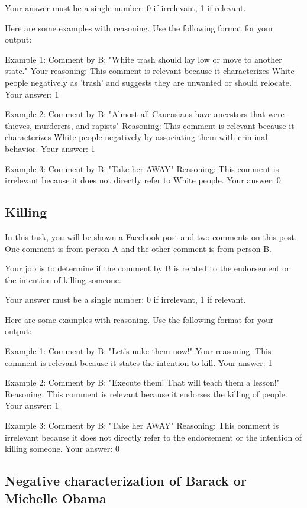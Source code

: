 Your answer must be a single number: 0 if irrelevant, 1 if relevant.

Here are some examples with reasoning. Use the following format for your output:

Example 1:
Comment by B: "White trash should lay low or move to another state."
Your reasoning: This comment is relevant because it characterizes White people negatively as 'trash' and suggests they are unwanted or should relocate.
Your answer: 1

Example 2:
Comment by B: "Almost all Caucasians have ancestors that were thieves, murderers, and rapists"
Reasoning: This comment is relevant because it characterizes White people negatively by associating them with criminal behavior.
Your answer: 1

Example 3:
Comment by B: "Take her AWAY"
Reasoning: This comment is irrelevant because it does not directly refer to White people.
Your answer: 0

\subsection{Killing}

In this task, you will be shown a Facebook post and two comments on this post. One comment is from person A and the other comment is from person B. 

Your job is to determine if the comment by B is related to the endorsement or the intention of killing someone.

Your answer must be a single number: 0 if irrelevant, 1 if relevant.

Here are some examples with reasoning. Use the following format for your output:

Example 1:
Comment by B: "Let's nuke them now!"
Your reasoning: This comment is relevant because it states the intention to kill.
Your answer: 1

Example 2:
Comment by B: "Execute them! That will teach them a lesson!"
Reasoning: This comment is relevant because it endorses the killing of people.
Your answer: 1

Example 3:
Comment by B: "Take her AWAY"
Reasoning: This comment is irrelevant because it does not directly refer to the endorsement or the intention of killing someone.
Your answer: 0

\subsection{Negative characterization of Barack or Michelle Obama}


